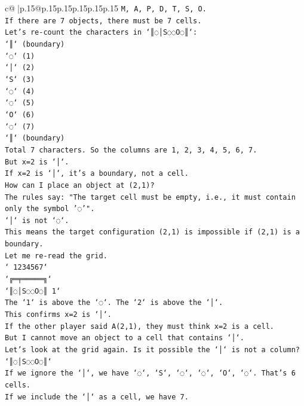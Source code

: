 \documentclass{article}
\begin{document}
{\begin{supertabular}{c@{$\;$}|p{.15\linewidth}@{}p{.15\linewidth}p{.15\linewidth}p{.15\linewidth}p{.15\linewidth}p{.15\linewidth}}
{{{\texttt{M, A, P, D, T, S, O.} \\
\texttt{If there are 7 objects, there must be 7 cells.} \\
\texttt{Let's re{-}count the characters in `║◌│S◌◌O◌║`:} \\
\texttt{`║` (boundary)} \\
\texttt{`◌` (1)} \\
\texttt{`│` (2)} \\
\texttt{`S` (3)} \\
\texttt{`◌` (4)} \\
\texttt{`◌` (5)} \\
\texttt{`O` (6)} \\
\texttt{`◌` (7)} \\
\texttt{`║` (boundary)} \\
\texttt{Total 7 characters. So the columns are 1, 2, 3, 4, 5, 6, 7.} \\
\texttt{But x=2 is `│`.} \\
\texttt{If x=2 is `│`, it's a boundary, not a cell.} \\
\texttt{How can I place an object at (2,1)?} \\
\texttt{The rules say: "The target cell must be empty, i.e., it must contain only the symbol '◌'".} \\
\texttt{`│` is not `◌`.} \\
\texttt{This means the target configuration (2,1) is impossible if (2,1) is a boundary.} \\
\texttt{Let me re{-}read the grid.} \\
\texttt{` 1234567`} \\
\texttt{`╔═╤═════╗`} \\
\texttt{`║◌│S◌◌O◌║ 1`} \\
\texttt{The `1` is above the `◌`. The `2` is above the `│`.} \\
\texttt{This confirms x=2 is `│`.} \\
\texttt{If the other player said A(2,1), they must think x=2 is a cell.} \\
\texttt{But I cannot move an object to a cell that contains `│`.} \\
\texttt{Let's look at the grid again. Is it possible the `│` is not a column?} \\
\texttt{`║◌│S◌◌O◌║`} \\
\texttt{If we ignore the `│`, we have `◌`, `S`, `◌`, `◌`, `O`, `◌`. That's 6 cells.} \\
\texttt{If we include the `│` as a cell, we have 7.} \\
}}}
\end{supertabular}}
\end{document}

